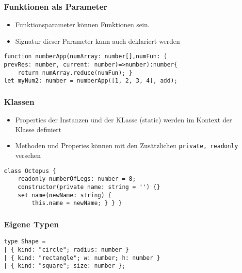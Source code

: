 \subsubsection{Funktionen als Parameter}
\begin{itemize}
    \item Funktionsparameter können Funktionen sein.
    \item Signatur dieser Parameter kann auch deklariert werden
\end{itemize}
\begin{lstlisting}
function numberApp(numArray: number[],numFun: (
prevRes: number, current: number)=>number):number{
    return numArray.reduce(numFun); }
let myNum2: number = numberApp([1, 2, 3, 4], add);
\end{lstlisting}

\subsubsection{Klassen}
\begin{itemize}
    \item Properties der Instanzen und der KLasse (static) werden im Kontext der Klasse definiert
    \item Methoden und Properies können mit den Zusätzlichen \texttt{private, readonly} versehen
\end{itemize}
\begin{lstlisting}
class Octopus {
    readonly numberOfLegs: number = 8;
    constructor(private name: string = '') {}
    set name(newName: string) {
        this.name = newName; } } }
\end{lstlisting}

\subsubsection{Eigene Typen}
\begin{lstlisting}
type Shape =
| { kind: "circle"; radius: number }
| { kind: "rectangle"; w: number; h: number } 
| { kind: "square"; size: number };

\end{lstlisting}

